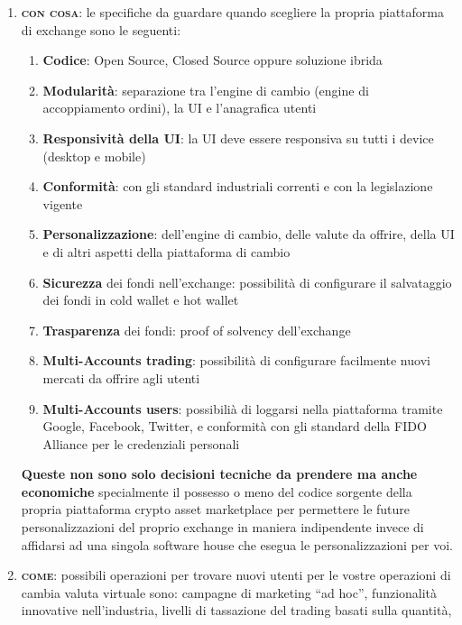 \begin{enumerate}
\begin{tcbraster}[raster columns=3,raster rows=2,raster height=5cm,
		valign=center, halign=center,
		enhanced,size=small,sharp corners,colframe=silver,coltext=black,
		colback=silver,fit algorithm=hybrid* ]
	\end{tcbraster}	

	\item \textbf{\textsc{con cosa}}: le specifiche da guardare quando scegliere la propria piattaforma di exchange sono le seguenti: 
		\begin{enumerate}[label*=\arabic*.]
			\item \textbf{Codice}: Open Source, Closed Source oppure soluzione ibrida
			\item \textbf{Modularità}: separazione tra l'engine di cambio (engine di accoppiamento ordini), la UI e l'anagrafica utenti
			\item \textbf{Responsività della UI}: la UI deve essere responsiva su tutti i device (desktop e mobile)
			\item \textbf{Conformità}: con gli standard industriali correnti e con la legislazione vigente
			\item \textbf{Personalizzazione}: dell'engine di cambio, delle valute da offrire, della UI e di altri aspetti della piattaforma di cambio
			\item \textbf{Sicurezza} dei fondi nell'exchange: possibilità di configurare il salvataggio dei fondi in cold wallet e hot wallet
			\item \textbf{Trasparenza} dei fondi: proof of solvency dell'exchange
			\item \textbf{Multi-Accounts trading}: possibilità di configurare facilmente nuovi mercati da offrire agli utenti
			\item \textbf{Multi-Accounts users}: possibilià di loggarsi nella piattaforma tramite Google, Facebook, Twitter, e conformità
			con gli standard della FIDO Alliance per le credenziali personali
		\end{enumerate}	
	\textbf{Queste non sono solo decisioni tecniche da prendere ma anche economiche} specialmente il possesso o meno del codice sorgente della propria 
	piattaforma	crypto asset marketplace per permettere le future personalizzazioni del proprio exchange in maniera indipendente invece di affidarsi
	ad una singola software house che esegua le personalizzazioni per voi.
	\item \textbf{\textsc{come}}: possibili operazioni per trovare nuovi utenti per le vostre operazioni di cambia valuta virtuale sono:
	campagne di marketing ``ad hoc'', funzionalità innovative nell'industria, livelli di tassazione del trading basati sulla quantità, 

\end{enumerate}
